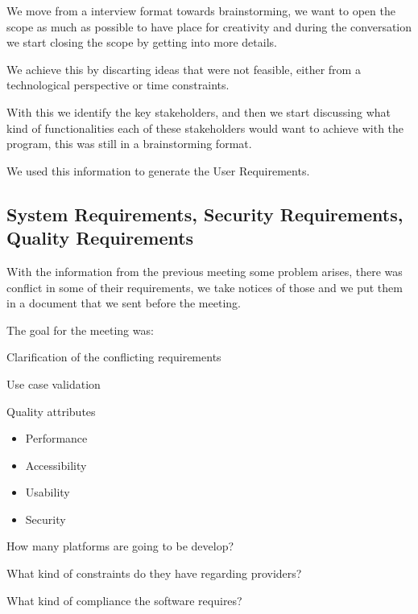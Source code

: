\noindent We move from a interview format towards brainstorming, we want to open 
the scope as much as possible to have place for creativity and during 
the conversation we start closing the scope by getting into more 
details.\newline

\noindent We achieve this by discarting ideas that were not feasible, 
either from a technological perspective or time constraints.

\pagebreak

\noindent With this we identify the key stakeholders, and then we start 
discussing what kind of functionalities each of these stakeholders would want 
to achieve with the program, this was still in a brainstorming format. \newline

\noindent We used this information to generate the User Requirements.

\subsection{System Requirements, Security Requirements, Quality Requirements}
With the information from the previous meeting some problem arises, there was 
conflict in some of their requirements, we take notices of those and we put 
them in a document that we sent before the meeting. \newline

\noindent The goal for the meeting was:
\begin{packed_enum}
    \item Clarification of the conflicting requirements
    \item Use case validation
    \item Quality attributes
    \begin{itemize}
        \item Performance
        \item Accessibility 
        \item Usability
        \item Security
    \end{itemize}
    \item How many platforms are going to be develop?
    \item What kind of constraints do they have regarding providers?
    \item What kind of compliance the software requires?
\end{packed_enum}

